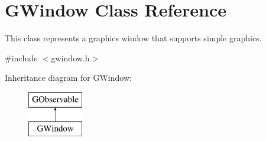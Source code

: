 \hypertarget{classGWindow}{}\section{G\+Window Class Reference}
\label{classGWindow}


This class represents a graphics window that supports simple graphics.  




{\ttfamily \#include $<$gwindow.\+h$>$}

Inheritance diagram for G\+Window\+:\begin{figure}[H]
\begin{center}
\leavevmode
\includegraphics[height=2.000000cm]{classGWindow}
\end{center}
\end{figure}

